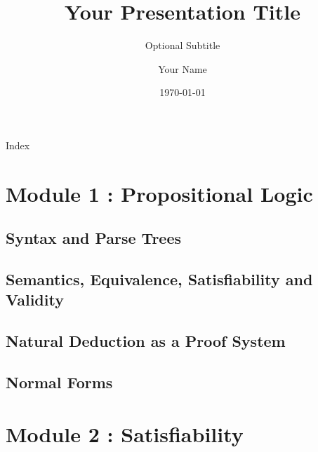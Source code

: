 \documentclass[4pt, aspectratio=169]{beamer} %
\title[Short Title]{Your Presentation Title}
\subtitle{Optional Subtitle}
\author[Author Initials]{Your Name}
\institute[Your Institution]{University / Company Name}
\date{\today}
\begin{document}


\begin{frame}{Index}
    \scriptsize\tableofcontents
\end{frame}

\section{Module 1 : Propositional Logic}

{
 
}
\subsection{Syntax and Parse Trees}
{
 
}
\subsection{Semantics, Equivalence, Satisfiability and Validity}
{
 
}
\subsection{Natural Deduction as a Proof System}
{
 
}
\subsection{Normal Forms}
{
 
}
\section{Module 2 : Satisfiability}
\end{document}
